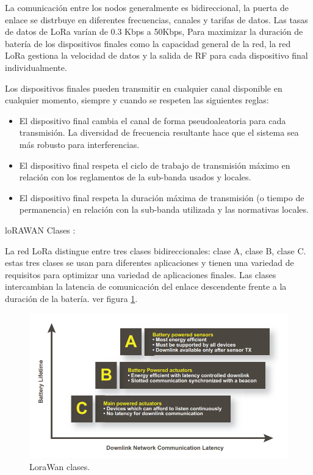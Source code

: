 La comunicación entre los nodos generalmente es bidireccional, la puerta de enlace se distrbuye en diferentes frecuencias, canales y tarifas de datos. Las tasas de datos de LoRa varían de 0.3 Kbps a 50Kbps, Para  maximizar la duración de batería de los dispositivos finales como la capacidad general de la red, la red LoRa gestiona la velocidad de datos y la salida de RF para cada dispositivo final individualmente\protect\footnotemark.


Los dispositivos finales pueden transmitir en cualquier canal disponible en cualquier momento, siempre y cuando se respeten las siguientes reglas:
\begin{itemize}
    \item El dispositivo final cambia el canal de forma pseudoaleatoria para cada  transmisión. La diversidad de frecuencia resultante hace que el sistema sea más robusto para interferencias.
    \item El dispositivo final respeta el ciclo de trabajo de transmisión máximo en relación con los reglamentos de la sub-banda usados y locales.
    \item El dispositivo final respeta la duración máxima de transmisión (o tiempo de permanencia) en relación con la sub-banda utilizada y las normativas locales.
\end{itemize}



loRAWAN Clases :

La red  LoRa distingue entre  tres clases bidireccionales: clase A, clase B, clase C. estas tres clases se usan para diferentes aplicaciones y tienen una variedad de requisitos para optimizar una variedad de aplicaciones finales. Las clases intercambian la latencia de comunicación del enlace descendente frente a la duración de la batería. ver figura \ref{fig:Loracomparacionclases}.

\begin{figure}[h]
	\centering
	\includegraphics[scale=.65]{./Figures/Loracomparacionclases.PNG}
	\caption{LoraWan clases\protect\footnotemark.}
	\label{fig:Loracomparacionclases}
\end{figure}


